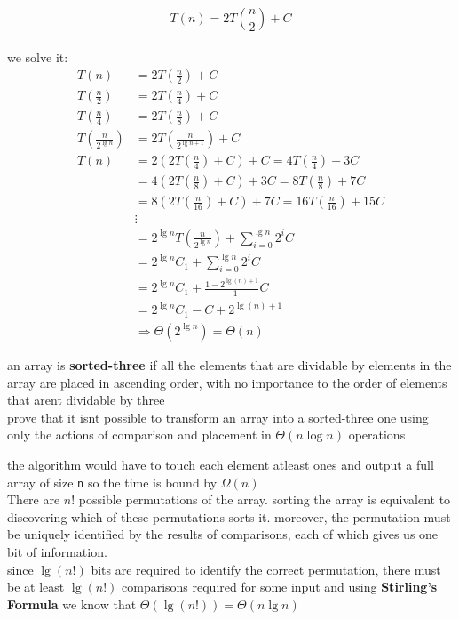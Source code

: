 \documentclass[a4paper,12pt]{article}
\begin{document}
\begin{question}
\begin{subquestion}
\begin{answer}
\[
T(n)=2T\left(\frac{n}{2}\right)+C
\]\\[0pt]
we solve it:\\[0pt]
\begin{align*}
  T(n) &= 2T\left(\frac{n}{2}\right) + C\\
  T\left(\frac{n}{2}\right) &= 2T\left(\frac{n}{4}\right) + C\\
  T\left(\frac{n}{4}\right) &= 2T\left(\frac{n}{8}\right) + C\\
  T\left(\frac{n}{2^{\lg n}}\right) &= 2T\left(\frac{n}{2^{\lg n+1}}\right) + C\\
  T(n) &= 2\left(2T\left(\frac{n}{4}\right) + C\right) + C = 4T\left(\frac{n}{4}\right) + 3C\\
  &= 4\left(2T\left(\frac{n}{8}\right)+C\right)+3C = 8T\left(\frac{n}{8}\right)+7C\\
  &= 8\left(2T\left(\frac{n}{16}\right)+C\right)+7C = 16T\left(\frac{n}{16}\right)+15C\\
  &\vdots\\
  &= 2^{\lg n}T\left(\frac{n}{2^{\lg n}}\right) + \sum_{i=0}^{\lg n} 2^{i}C\\
  &= 2^{\lg n}C_1 + \sum_{i=0}^{\lg n} 2^{i}C\\
  &= 2^{\lg n}C_1 + \frac{1-2^{\lg(n)+1}}{-1}C\\
  &= 2^{\lg n}C_1-C+2^{\lg(n)+1}\\
  &\Rightarrow \Theta\left(2^{\lg n}\right) = \Theta(n)
\end{align*}
\end{answer}
\end{subquestion}
\end{question}

\begin{question}
an array is \textbf{sorted-three} if all the elements that are dividable by elements in the array are placed in ascending order, with no importance to the order of elements that arent dividable by three\\[0pt]
prove that it isnt possible to transform an array into a sorted-three one using only the actions of comparison and placement in \(\Theta(n\log n)\) operations\\[0pt]
\begin{answer}
the algorithm would have to touch each element atleast ones and output a full array of size \texttt{n} so the time is bound by \(\Omega(n)\)\\[0pt]
There are \(n!\) possible permutations of the array. sorting the array is equivalent to discovering which of these permutations sorts it. moreover, the permutation must be uniquely identified by the results of comparisons, each of which gives us one bit of information.\\[0pt]
since \(\lg(n!)\) bits are required to identify the correct permutation, there must be at least \(\lg(n!)\) comparisons required for some input and using \textbf{Stirling’s Formula} we know that \(\Theta(\lg(n!))=\Theta(n\lg n)\)\\[0pt]
\end{answer}
\end{question}
\end{document}
